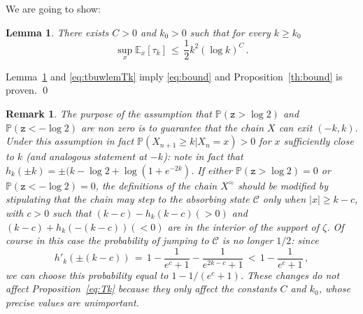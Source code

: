 \documentclass[reqno,11pt]{amsart}
\numberwithin{equation}{section}
\newtheorem{lemma}[theorem]{Lemma}
\newtheorem{rem}[theorem]{Remark}
\newcommand{\cC}{{\ensuremath{\mathcal C}} }
\newcommand{\bbE}{{\ensuremath{\mathbb E}} }
\newcommand{\bbP}{{\ensuremath{\mathbb P}} }
\newcommand{\gz}{\zeta}
\newcommand{\logZ}{\mathtt{z}}
\begin{document}
We are going to show:



\medskip

\begin{lemma}
\label{th:Tk}
There exists $C>0$ and $k_0>0$ such that for every $k \ge k_0$
\begin{equation}
\label{eq:Tk}
\sup_{x }\bbE_x\left[ \tau_k\right] \, \le \, \frac 12 k^2 \left( \log k \right)^C \, .
\end{equation}
\end{lemma}
\medskip

Lemma~\ref{th:Tk} and \eqref{eq:tbuwlemTk} imply \eqref{eq:bound} and Proposition~\ref{th:bound} is proven.
\qed

\medskip

\begin{rem}
\label{rem:2}
The purpose of the assumption that  $\bbP(\logZ > \log 2)$ and $\bbP(\logZ < -\log 2 )$ are non zero is to guarantee that 
the  chain $X$ can exit $(-k,k)$. Under this assumption in fact $\bbP(X_{n+1}\ge k\vert X_n=x)>0$
for  
$x$ sufficiently close to $k$ (and analogous statement at $-k$): note in fact that $h_k(\pm k)= \pm (k-\log 2+ \log(1+e^{-2k})$.  If either $\bbP(\logZ > \log 2)=0$ or   $\bbP(\logZ < -\log 2 )=0$, the definitions of the chain $X^\approx$ should be modified by stipulating that the chain may step 
 to the absorbing state $\cC$ only  when $\vert x \vert \ge k-c$, with $c>0$ such that 
$(k-c)-h_k(k-c)(>0)$ and $(k-c)+h_k(-(k-c))(< 0)$ are in the interior of the support of $\gz$. Of course  in this case the probability of 
jumping to $\cC$ is no longer $1/2$: since 
\begin{equation}
\label{eq:1/2tcasece }
h'_k(\pm (k -c))\, =\,
1- \frac 1{e^c+1}- \frac 1{e^{2k-c}+1} \, <\,  1- \frac 1{e^c+1}\, ,
\end{equation}
we can choose this probability equal to $1- 1/(e^c+1)$. These changes do not affect Proposition~\ref{eq:Tk} because they only affect the constants $C$ and $k_0$, whose precise values are unimportant.
\end{rem}

\medskip


 
  
  
 
 \medskip
 
\medskip
\end{document}
